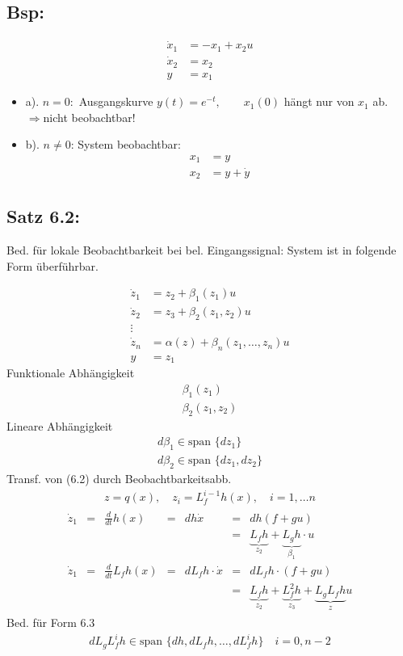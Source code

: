 \documentclass[ngerman]{tudscrreprt}
\begin{document}
\subsection*{Bsp:} \begin{align*}
\dot x_1 &= -x_1 + x_2 u\\ 
\dot x_2 &= x_2\\ 
y &= x_1
\end{align*}
\begin{itemize}
\item a). $n=0:$ Ausgangskurve $y(t) = e^{-t}, \qquad x_1(0) $ hängt nur von $x_1 $ ab.\\  $\Rightarrow $nicht beobachtbar!
\item b). $n\ne 0$: System beobachtbar:\begin{align*} x_1&= y\\ x_2&= y + \dot y\end{align*}
\end{itemize}
\subsection*{Satz 6.2:} Bed. für lokale Beobachtbarkeit bei bel. Eingangssignal: System ist in folgende Form überführbar.

\begin{align*}
\dot z_1 &= z_2 + \beta_1 (z_1) u\\ 
\dot z_2 &= z_3 + \beta_2(z_1, z_2) u\\ 
\vdots\\ 
\dot z_n &= \alpha(z) + \beta_n(z_1, \dots, z_n)u\\ 
y &= z_1 \tag{6.3}
\end{align*}
Funktionale Abhängigkeit \begin{align*} \beta_1(z_1)\\ \beta_2(z_1,z_2)\end{align*} Lineare Abhängigkeit \begin{align*}
d\beta_1 \in \text{span }\{ dz_1\}\\ 
d\beta_2 \in \text{span }\{dz_1, dz_2\}
\end{align*}
Transf. von (6.2) durch Beobachtbarkeitsabb. 
\begin{align*}
z  = q(x), \quad z_i = L_f^{i-1}h(x), \quad i= 1,\dots n
\end{align*}
\begin{align*}
\begin{matrix}
\dot z_1 &=& \frac{d}{dt}h(x) &=& dh\dot x &=& dh(f + g u)\\ 
&& && &=&\underbrace{L_f h}_{z_2} + \underbrace{L_g h}_{\beta_1} \cdot u\\
\dot z_1 &=&\frac{d}{dt}L_fh(x) &=&dL_fh\cdot \dot x &=& dL_fh\cdot (f + gu)\\ 
&& && &=&\underbrace{L_f h}_{z_2} + \underbrace{L_f^2h}_{z_3} + \underbrace{L_g L_f h}_{z } u 
\end{matrix}
\end{align*}
Bed. für Form 6.3 \begin{align*}
dL_g L_f^i h \in \text{span }\{ dh, dL_f h, \dots, dL_f^i h \} \quad i =0, n-2
\end{align*}
\end{document}
